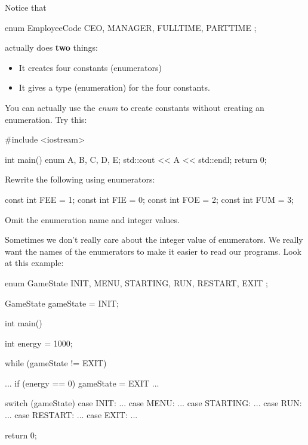 \newpage{}

Notice that

\begin{consolethree}[escapeinside=||]
enum EmployeeCode
{
    CEO, MANAGER, FULLTIME, PARTTIME
};
\end{consolethree}

actually does \textbf{two} things:

\begin{itemize}
\item It creates four constants (enumerators)
\item It gives a type (enumeration) for the four constants.
\end{itemize}

You can actually use the \textit{enum} to create constants without
creating an enumeration. Try this:

\begin{consolethree}[escapeinside=||]
#include <iostream>

int main()
{
    enum {A, B, C, D, E};
    std::cout << A << std::endl;
    return 0;
}
\end{consolethree}

\begin{ex}
Rewrite the following using enumerators:

\begin{consolethree}[escapeinside=||]
const int FEE = 1;
const int FIE = 0;
const int FOE = 2;
const int FUM = 3;
\end{consolethree}

Omit the enumeration name and integer values.
\end{ex}


\newpage{}

Sometimes we don't really care about the integer value
of enumerators. We really want the names of the enumerators to make it
easier to read our programs. Look at this example:

\begin{consolethree}[escapeinside=||]
enum GameState
{
    INIT, MENU, STARTING, RUN, RESTART, EXIT
};

GameState gameState = INIT;

int main()
{
    int energy = 1000;

    while (gameState != EXIT)
    {
        ...
        if (energy == 0)
            gameState = EXIT
        ...

        switch (gameState)
        {
            case INIT: ...
            case MENU: ...
            case STARTING: ...
            case RUN: ...
            case RESTART: ...
            case EXIT: ...
        }
    }

    return 0;
}
\end{consolethree}

